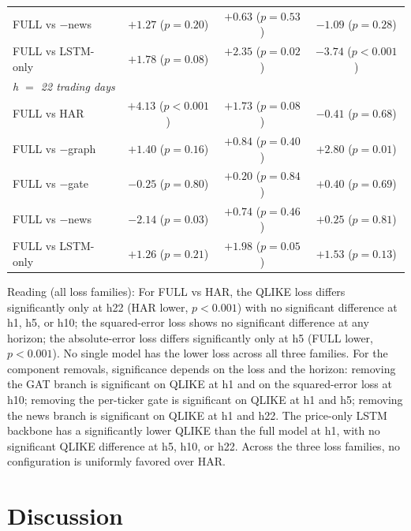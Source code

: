 \documentclass[runningheads]{llncs}
\begin{document}
\begin{table}[t]
\begin{tabular}{lccc}
FULL vs $-$news   & $+1.27$ (\(p=0.20\)) & $+0.63$ (\(p=0.53\)) & $-1.09$ (\(p=0.28\)) \\
FULL vs LSTM-only & $+1.78$ (\(p=0.08\)) & $\mathbf{+2.35}$ (\(p=0.02\)) & $\mathbf{-3.74}$ (\(p<0.001\)) \\
\midrule
\multicolumn{4}{l}{\emph{h $=$ 22 trading days}} \\
FULL vs HAR       & $\mathbf{+4.13}$ (\(p<0.001\)) & $+1.73$ (\(p=0.08\)) & $-0.41$ (\(p=0.68\)) \\
FULL vs $-$graph  & $+1.40$ (\(p=0.16\)) & $+0.84$ (\(p=0.40\)) & $\mathbf{+2.80}$ (\(p=0.01\)) \\
FULL vs $-$gate   & $-0.25$ (\(p=0.80\)) & $+0.20$ (\(p=0.84\)) & $+0.40$ (\(p=0.69\)) \\
FULL vs $-$news   & $\mathbf{-2.14}$ (\(p=0.03\)) & $+0.74$ (\(p=0.46\)) & $+0.25$ (\(p=0.81\)) \\
FULL vs LSTM-only & $+1.26$ (\(p=0.21\)) & $+1.98$ (\(p=0.05\)) & $+1.53$ (\(p=0.13\)) \\
\bottomrule
\end{tabular}
\end{table}

Reading (all loss families): For FULL vs HAR, the QLIKE loss differs significantly only at h22 (HAR lower,
$p<0.001$) with no significant difference at h1, h5, or h10; the squared-error loss shows no significant
difference at any horizon; the absolute-error loss differs significantly only at h5 (FULL lower,
$p<0.001$). No single model has the lower loss across all three families. For the component removals,
significance depends on the loss and the horizon: removing the GAT branch is significant on QLIKE at h1 and
on the squared-error loss at h10; removing the per-ticker gate is significant on QLIKE at h1 and h5;
removing the news branch is significant on QLIKE at h1 and h22. The price-only LSTM backbone has a
significantly lower QLIKE than the full model at h1, with no significant QLIKE difference at h5, h10, or
h22. Across the three loss families, no configuration is uniformly favored over HAR.

\section{Discussion}
\label{sec:discussion}
\end{document}
